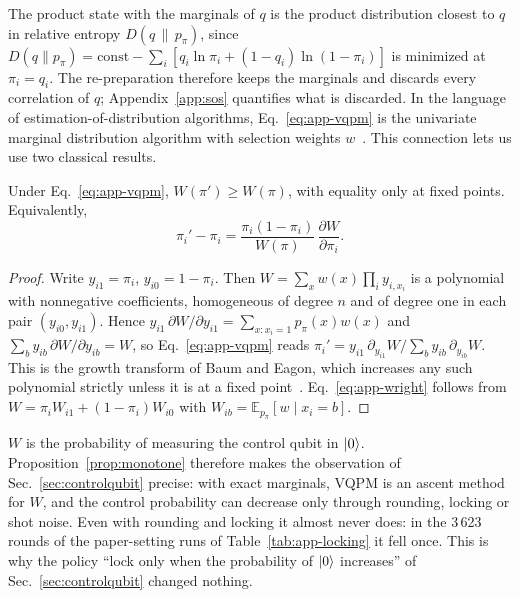 The product state with the marginals of $q$ is the product distribution closest to $q$ in relative entropy $D(q\,\|\,p_\pi)$, since $D(q\|p_\pi)=\mathrm{const}-\sum_i[q_i\ln\pi_i+(1-q_i)\ln(1-\pi_i)]$ is minimized at $\pi_i=q_i$. The re-preparation therefore keeps the marginals and discards every correlation of $q$; Appendix~\ref{app:sos} quantifies what is discarded. In the language of estimation-of-distribution algorithms, Eq.~\eqref{eq:app-vqpm} is the univariate marginal distribution algorithm with selection weights $w$~\cite{muhlenbein1996recombination}. This connection lets us use two classical results.

\begin{proposition}
\label{prop:monotone}
Under Eq.~\eqref{eq:app-vqpm}, $W(\pi')\ge W(\pi)$, with equality only at fixed points. Equivalently,
\begin{equation}
\pi_i'-\pi_i=\frac{\pi_i(1-\pi_i)}{W(\pi)}\,\frac{\partial W}{\partial\pi_i}.
\label{eq:app-wright}
\end{equation}
\end{proposition}
\begin{proof}
Write $y_{i1}=\pi_i$, $y_{i0}=1-\pi_i$. Then $W=\sum_xw(x)\prod_iy_{i,x_i}$ is a polynomial with nonnegative coefficients, homogeneous of degree $n$ and of degree one in each pair $(y_{i0},y_{i1})$. Hence $y_{i1}\,\partial W/\partial y_{i1}=\sum_{x:x_i=1}p_\pi(x)w(x)$ and $\sum_b y_{ib}\,\partial W/\partial y_{ib}=W$, so Eq.~\eqref{eq:app-vqpm} reads $\pi_i'=y_{i1}\,\partial_{y_{i1}}W/\sum_by_{ib}\,\partial_{y_{ib}}W$. This is the growth transform of Baum and Eagon, which increases any such polynomial strictly unless it is at a fixed point~\cite{baum1967inequality,baum1968growth}. Eq.~\eqref{eq:app-wright} follows from $W=\pi_iW_{i1}+(1-\pi_i)W_{i0}$ with $W_{ib}=\mathbb{E}_{p_\pi}[w\mid x_i=b]$.
\end{proof}

$W$ is the probability of measuring the control qubit in $\left|0\right\rangle$. Proposition~\ref{prop:monotone} therefore makes the observation of Sec.~\ref{sec:controlqubit} precise: with exact marginals, VQPM is an ascent method for $W$, and the control probability can decrease only through rounding, locking or shot noise. Even with rounding and locking it almost never does: in the 3\,623 rounds of the paper-setting runs of Table~\ref{tab:app-locking} it fell once. This is why the policy ``lock only when the probability of $\left|0\right\rangle$ increases'' of Sec.~\ref{sec:controlqubit} changed nothing.

